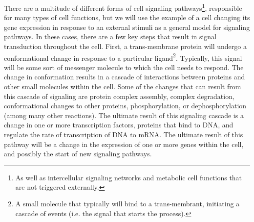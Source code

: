\documentclass[12pt,twoside]{reedthesis}
\theoremstyle{definition}
\begin{document}
There are a multitude of different forms of cell signaling pathways\footnote{As well as intercellular signaling networks and metabolic cell functions that are not triggered externally.}, responsible for many types of cell functions, but we will use the example of a cell changing its gene expression in response to an external stimuli as a general model for signaling pathways. In these cases, there are a few key steps that result in signal transduction throughout the cell. First, a trans-membrane protein will undergo a conformational change in response to a particular ligand\footnote{A small molecule that typically will bind to a trans-membrant, initiating a cascade of events (i.e. the signal that starts the process).}. Typically, this signal will be some sort of messenger molecule to which the cell needs to respond. The change in conformation results in a cascade of interactions between proteins and other small molecules within the cell. Some of the changes that can result from this cascade of signaling are protein complex assembly, complex degradation, conformational changes to other proteins, phosphorylation, or dephosphorylation (among many other reactions). The ultimate result of this signaling cascade is a change in one or more transcription factors, proteins that bind to DNA, and regulate the rate of transcription of DNA to mRNA. The ultimate result of this pathway will be a change in the expression of one or more genes within the cell, and possibly the start of new signaling pathways.\par
\end{document}
